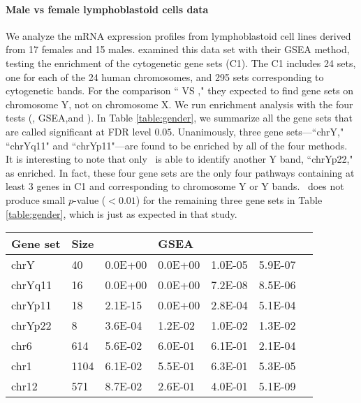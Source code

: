 	\paragraph{Male vs female lymphoblastoid cells data}
	We analyze the mRNA expression profiles from lymphoblastoid cell lines derived from 17 females 
	and	15 males. \citet{subramanian2005gene} examined this data set with their GSEA method, 
	testing the enrichment of the  cytogenetic gene sets (C1). The C1 includes 24 sets, one for 
	each of the 24 human chromosomes, and 295 sets corresponding to cytogenetic bands. For the 
	comparison `` VS ," they expected to find gene sets on chromosome Y, 
	not on chromosome X. We run enrichment analysis with the four tests (\OurMethod, GSEA,\CMT and 
	\genr). In Table \ref{table:gender}, we summarize all the gene sets that are called significant 
	at FDR level $0.05$. Unanimously, three gene sets---``chrY," ``chrYq11" and ``chrYp11"---are 
	found to be enriched by all of the four methods. It is interesting to note that only 
	\OurMethod~is able to identify another Y band, ``chrYp22," as enriched. In fact, these four 
	gene sets are the only four pathways containing at least 3 genes in  C1 and corresponding to 
	chromosome Y or Y bands. \OurMethod~does not produce small $p$-value ($<0.01$) for the 
	remaining three gene sets in Table \ref{table:gender}, which is just as expected in that study.
		
	\begin{table*}[!ht]
		\centering
		\caption[Enriched gene sets and their nominal $p$ values for lymphoblastoid cells 
		data]{Enriched gene sets and their nominal $p$ values for lymphoblastoid cells data. 
		Reported are gene sets with $\text{FDR}<0.05$ for at least one of the \OurMethod, GSEA, 
		\CMT~and \genr~methods using \FDR~(\FDRabb) procedure.}
		\begin{tabular}{p{2cm}p{1cm}p{2cm}p{2cm}p{3cm}p{2cm}p{0.5cm}} \hline
			Gene set & Size & \OurMethod & GSEA & \CMT & \genr \\ 		\hline
			chrY & 40 & 0.0E+00 & 0.0E+00 & 1.0E-05 & 5.9E-07 \\ 
			chrYq11 & 16 & 0.0E+00 & 0.0E+00 & 7.2E-08 & 8.5E-06 \\ 
			chrYp11 & 18 & 2.1E-15 & 0.0E+00 & 2.8E-04 & 5.1E-04 \\ 
			chrYp22 & 8 & 3.6E-04 & 1.2E-02 & 1.0E-02 & 1.3E-02 \\ 
			chr6 & 614 & 5.6E-02 & 6.0E-01 & 6.1E-01 & 2.1E-04 \\ 
			chr1 & 1104 & 6.1E-02 & 5.5E-01 & 6.3E-01 & 5.3E-05 \\ 
			chr12 & 571 & 8.7E-02 & 2.6E-01 & 4.0E-01 & 5.1E-09 \\ 
			\hline
		\end{tabular}
		\label{table:gender}
	\end{table*}
	
